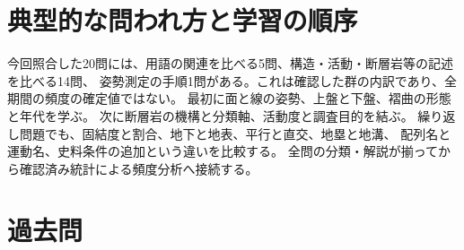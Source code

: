 \section{典型的な問われ方と学習の順序}
今回照合した20問には、用語の関連を比べる5問、構造・活動・断層岩等の記述を比べる14問、
姿勢測定の手順1問がある。これは確認した群の内訳であり、全期間の頻度の確定値ではない。
最初に面と線の姿勢、上盤と下盤、褶曲の形態と年代を学ぶ。
次に断層岩の機構と分類軸、活動度と調査目的を結ぶ。
繰り返し問題でも、固結度と割合、地下と地表、平行と直交、地塁と地溝、
配列名と運動名、史料条件の追加という違いを比較する。
全問の分類・解説が揃ってから確認済み統計による頻度分析へ接続する。

\section{過去問}

